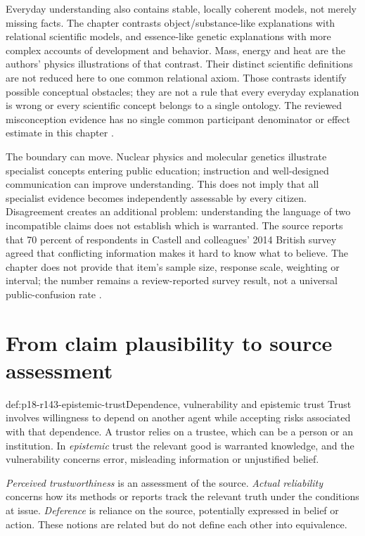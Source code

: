 Everyday understanding also contains stable, locally coherent models,
not merely missing facts. The chapter contrasts object/substance-like
explanations with relational scientific models, and essence-like genetic
explanations with more complex accounts of development and behavior.
Mass, energy and heat are the authors' physics illustrations of that
contrast. Their distinct scientific definitions are not reduced here
to one common relational axiom.
Those contrasts identify possible conceptual obstacles; they are not
a rule that every everyday explanation is wrong or every scientific
concept belongs to a single ontology. The reviewed misconception evidence
has no single common participant denominator or effect estimate in this
chapter \cite[pp.~768--769]{BrommeGierth2021PublicScience}.

The boundary can move. Nuclear physics and molecular genetics illustrate
specialist concepts entering public education; instruction and well-designed
communication can improve understanding. This does not imply that all
specialist evidence becomes independently assessable by every citizen.
Disagreement creates an additional problem: understanding the language
of two incompatible claims does not establish which is warranted.
The source reports that 70 percent of respondents in Castell and colleagues'
2014 British survey agreed that conflicting information makes it hard
to know what to believe. The chapter does not provide that item's sample
size, response scale, weighting or interval; the number remains a
review-reported survey result, not a universal public-confusion rate
\cite[p.~769 and note~5]{BrommeGierth2021PublicScience}.

\section{From claim plausibility to source assessment}
\label{sec:p18-r143-trust}

\begin{hbdefinition}{def:p18-r143-epistemic-trust}{Dependence, vulnerability and epistemic trust}
Trust involves willingness to depend on another agent while accepting
risks associated with that dependence. A trustor relies on a trustee,
which can be a person or an institution. In \emph{epistemic} trust the
relevant good is warranted knowledge, and the vulnerability concerns
error, misleading information or unjustified belief.

\emph{Perceived trustworthiness} is an assessment of the source.
\emph{Actual reliability} concerns how its methods or reports track the
relevant truth under the conditions at issue. \emph{Deference} is reliance
on the source, potentially expressed in belief or action. These notions
are related but do not define each other into equivalence.
\end{hbdefinition}

